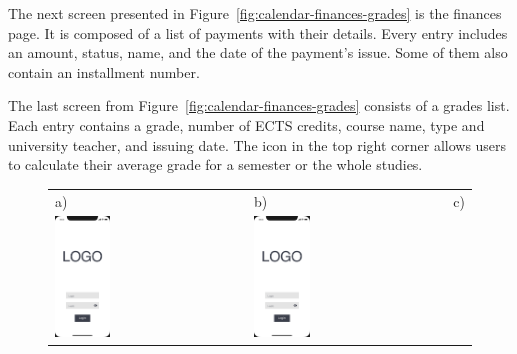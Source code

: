 The next screen presented in Figure~\ref{fig:calendar-finances-grades} is the finances page. It is composed of a list of payments with their details. Every entry includes an amount, status, name, and the date of the payment's issue. Some of them also contain an installment number.

The last screen from Figure~\ref{fig:calendar-finances-grades} consists of a grades list. Each entry contains a grade, number of ECTS credits, course name, type and university teacher, and issuing date. The icon in the top right corner allows users to calculate their average grade for a semester or the whole studies.

\begin{figure}[htb]
    \centering
    \begin{tabular}{@{}lll@{}}
        a) & b) & c) \\
        \includegraphics[page=2,width=0.300\textwidth]{fig03/jsos_helper_wireframe.pdf} &
        \includegraphics[page=6,width=0.300\textwidth]{fig03/jsos_helper_wireframe.pdf} &

\end{tabular}
\end{figure}
